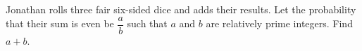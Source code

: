 Jonathan rolls three fair six-sided dice and adds their results. Let the probability that their sum is even be $\dfrac{a}{b}$ such that $a$ and $b$ are relatively prime integers. Find $a+b$.
